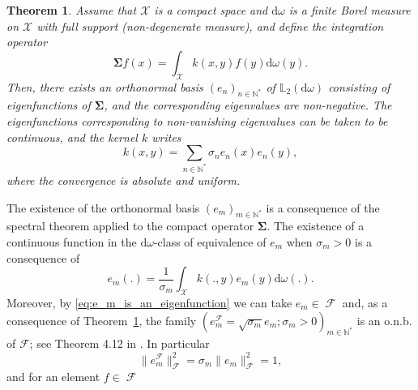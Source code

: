 \documentclass[twoside,11pt]{book}
\newtheorem{theorem}{Theorem}
\numberwithin{theorem}{chapter}
\numberwithin{definition}{chapter}
\numberwithin{proposition}{chapter}
\numberwithin{corollary}{chapter}
\numberwithin{example}{chapter}
\numberwithin{lemma}{chapter}
\numberwithin{assumption}{chapter}
\DeclareMathOperator{\F}{\mathcal{F}}
\DeclareMathOperator{\X}{\mathcal{X}}
\begin{document}

\begin{theorem}\label{thm:Mercer_for_compact}
Assume that $\mathcal{X}$ is a compact space and $\mathrm{d}\omega$ is a finite Borel measure on $\mathcal{X}$ with full support (non-degenerate measure), and define the integration operator
\begin{equation}
\bm{\Sigma} f(x) = \int_{\mathcal{X}} k(x,y)f(y) \mathrm{d}\omega(y).
\end{equation}
Then, there exists an orthonormal basis $(e_{n})_{n \in \mathbb{N}^{*}}$ of $\mathbb{L}_{2}(\mathrm{d}\omega)$ consisting of eigenfunctions of $\bm{\Sigma}$, and the corresponding eigenvalues are non-negative.
The eigenfunctions corresponding to non-vanishing eigenvalues can be taken to be continuous, and the kernel $k$ writes
\begin{equation}
k(x,y) = \sum\limits_{n \in \mathbb{N}^{*}} \sigma_{n} e_{n}(x)e_{n}(y),
\end{equation}
where the convergence is absolute and uniform.
\end{theorem}
The existence of the orthonormal basis $(e_m)_{m \in \mathbb{N}^{*}}$ is a consequence of the spectral theorem applied to the compact operator $\bm{\Sigma}$. The existence of a continuous function in the $\mathrm{d}\omega$-class of equivalence of $e_{m}$ when $\sigma_m>0$ is a consequence of
\begin{equation}\label{eq:e_m_is_an_eigenfunction}
e_{m}(.) = \frac{1}{\sigma_m} \int_{\X}k(.,y) e_{m}(y) \mathrm{d}\omega(.).
\end{equation}
Moreover, by \eqref{eq:e_m_is_an_eigenfunction} we can take $e_{m} \in \F$ and, as a consequence of Theorem~\ref{thm:Mercer_for_compact}, the family $(e_{m}^{\F} = \sqrt{\sigma_m}e_m; \sigma_m>0)_{m \in \mathbb{N}^{*}}$ is an o.n.b. of $\mathcal{F}$; see Theorem 4.12 in \cite{CuZh07}. In particular
\begin{equation}
\|e_{m}^{\F}\|_{\F}^{2} = \sigma_{m}\|e_{m}\|_{\F}^{2} = 1,
\end{equation}
and for an element $f \in \F$ 
\end{document}
